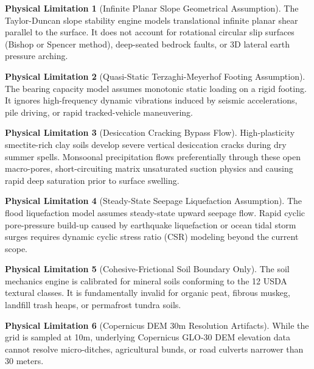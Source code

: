 \documentclass[11pt,a4paper]{article}
\theoremstyle{definition}
\newtheorem{limitation}{Physical Limitation}[section]
\theoremstyle{remark}
\begin{document}
\begin{limitation}[Infinite Planar Slope Geometrical Assumption]
    The Taylor-Duncan slope stability engine models translational infinite planar shear parallel to the surface. It does not account for rotational circular slip surfaces (Bishop or Spencer method), deep-seated bedrock faults, or 3D lateral earth pressure arching.
\end{limitation}

\begin{limitation}[Quasi-Static Terzaghi-Meyerhof Footing Assumption]
    The bearing capacity model assumes monotonic static loading on a rigid footing. It ignores high-frequency dynamic vibrations induced by seismic accelerations, pile driving, or rapid tracked-vehicle maneuvering.
\end{limitation}

\begin{limitation}[Desiccation Cracking Bypass Flow]
    High-plasticity smectite-rich clay soils develop severe vertical desiccation cracks during dry summer spells. Monsoonal precipitation flows preferentially through these open macro-pores, short-circuiting matrix unsaturated suction physics and causing rapid deep saturation prior to surface swelling.
\end{limitation}

\begin{limitation}[Steady-State Seepage Liquefaction Assumption]
    The flood liquefaction model assumes steady-state upward seepage flow. Rapid cyclic pore-pressure build-up caused by earthquake liquefaction or ocean tidal storm surges requires dynamic cyclic stress ratio (CSR) modeling beyond the current scope.
\end{limitation}

\begin{limitation}[Cohesive-Frictional Soil Boundary Only]
    The soil mechanics engine is calibrated for mineral soils conforming to the 12 USDA textural classes. It is fundamentally invalid for organic peat, fibrous muskeg, landfill trash heaps, or permafrost tundra soils.
\end{limitation}

\begin{limitation}[Copernicus DEM 30m Resolution Artifacts]
    While the grid is sampled at 10m, underlying Copernicus GLO-30 DEM elevation data cannot resolve micro-ditches, agricultural bunds, or road culverts narrower than 30 meters.
\end{limitation}
\end{document}
